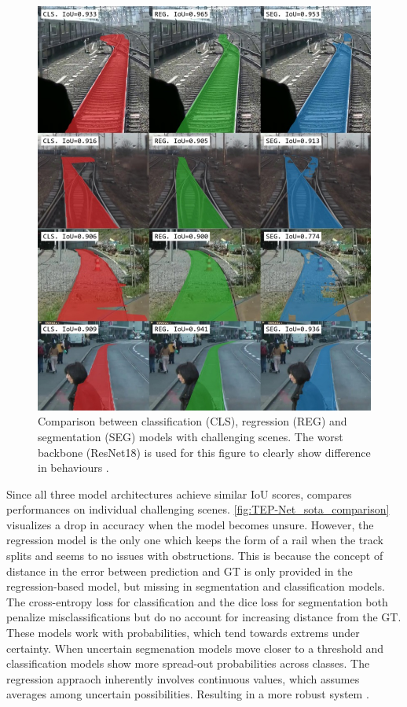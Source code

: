 \begin{figure}[H]
    \centering
    \includegraphics[width=0.7\linewidth]{PICs/Baselinepaper/comparison_sota_tep-net.jpg}
    \caption{Comparison between classification (CLS), regression (REG) and segmentation (SEG) models with challenging scenes.
    The worst backbone (ResNet18) is used for this figure to clearly show difference in behaviours \cite{tepNet2024}.}
    \label{fig:TEP-Net_sota_comparison}
\end{figure}

Since all three model architectures achieve similar \ac{IoU} scores, \cite{tepNet2024} compares performances on individual challenging scenes.
\autoref{fig:TEP-Net_sota_comparison} visualizes a drop in accuracy when the model becomes unsure.
However, the regression model is the only one which keeps the form of a rail when the track splits and seems to no issues with obstructions.
This is because the concept of distance in the error between prediction and \ac{GT} is only provided in the regression-based model, but missing in segmentation and classification models.
The cross-entropy loss for classification and the dice loss for segmentation both penalize misclassifications but do no account for increasing distance from the \ac{GT}.
These models work with probabilities, which tend towards extrems under certainty.
When uncertain segmenation models move closer to a threshold and classification models show more spread-out probabilities across classes.
The regression appraoch inherently involves continuous values, which assumes averages among uncertain possibilities.
Resulting in a more robust system \cite{tepNet2024}.

